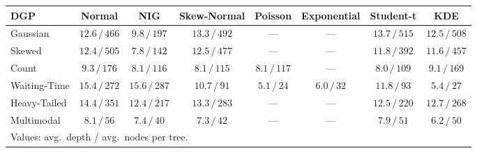 \begin{tabular}{lccccccc}
\toprule
DGP & Normal & NIG & Skew-Normal & Poisson & Exponential & Student-t & KDE \\
\midrule
Gaussian & $12.6\,/\,466$ & $9.8\,/\,197$ & $13.3\,/\,492$ & --- & --- & $13.7\,/\,515$ & $12.5\,/\,508$ \\
Skewed & $12.4\,/\,505$ & $7.8\,/\,142$ & $12.5\,/\,477$ & --- & --- & $11.8\,/\,392$ & $11.6\,/\,457$ \\
Count & $9.3\,/\,176$ & $8.1\,/\,116$ & $8.1\,/\,115$ & $8.1\,/\,117$ & --- & $8.0\,/\,109$ & $9.1\,/\,169$ \\
Waiting-Time & $15.4\,/\,272$ & $15.6\,/\,287$ & $10.7\,/\,91$ & $5.1\,/\,24$ & $6.0\,/\,32$ & $11.8\,/\,93$ & $5.4\,/\,27$ \\
Heavy-Tailed & $14.4\,/\,351$ & $12.4\,/\,217$ & $13.3\,/\,283$ & --- & --- & $12.5\,/\,220$ & $12.7\,/\,268$ \\
Multimodal & $8.1\,/\,56$ & $7.4\,/\,40$ & $7.3\,/\,42$ & --- & --- & $7.9\,/\,51$ & $6.2\,/\,50$ \\
\bottomrule
\multicolumn{8}{l}{\footnotesize Values: avg.\ depth / avg.\ nodes per tree.} \\
\end{tabular}
